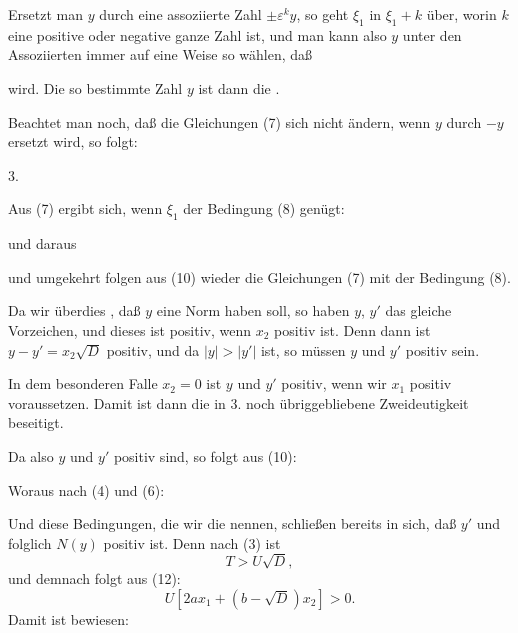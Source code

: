 
Ersetzt man $y$ durch eine assoziierte Zahl $\pm\varepsilon^k y$, so geht $\xi_1$
in $\xi_1 + k$ über, worin $k$ eine positive oder negative ganze Zahl
ist, und man kann also $y$ unter den Assoziierten immer auf eine
Weise so wählen, daß


wird. Die so bestimmte Zahl $y$ ist dann die .

Beachtet man noch, daß die Gleichungen (7) sich nicht
ändern, wenn $y$ durch $-y$ ersetzt wird, so folgt:

3. 

Aus (7) ergibt sich, wenn $\xi_1$ der Bedingung (8) genügt:


und daraus


und umgekehrt folgen aus (10) wieder die Gleichungen (7) mit
der Bedingung (8).

Da wir überdies , daß $y$ eine 
Norm haben soll, so haben $y$, $y'$ das gleiche Vorzeichen, und dieses
ist positiv, wenn $x_2$ positiv ist. Denn dann ist $y - y' = x_2\sqrt{D}$
positiv, und da $|y| > |y'|$ ist, so müssen $y$ und $y'$ positiv sein.

In dem besonderen Falle $x_2 = 0$ ist $y$ und $y'$ positiv, wenn
wir $x_1$ positiv voraussetzen. Damit ist dann die in 3. noch übriggebliebene
Zweideutigkeit beseitigt.

Da also $y$ und $y'$ positiv sind, so folgt aus (10):


Woraus nach (4) und (6):


Und diese Bedingungen, die wir die 
nennen, schließen bereits in sich, daß $y'$ und folglich
$N(y)$ positiv ist. Denn nach (3) ist
\[
T > U\sqrt{D},
\]
und demnach folgt aus (12):
\[
U[2ax_1 + (b-\sqrt{D})x_2] > 0.
\]
Damit ist bewiesen:
